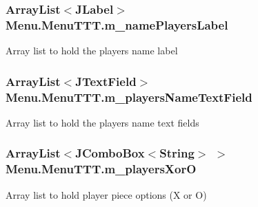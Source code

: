 \subsubsection[{m\+\_\+name\+Players\+Label}]{\setlength{\rightskip}{0pt plus 5cm}Array\+List$<$J\+Label$>$ Menu.\+Menu\+T\+T\+T.\+m\+\_\+name\+Players\+Label\hspace{0.3cm}{\ttfamily [private]}}\label{class_menu_1_1_menu_t_t_t_a3a18e1c57089dedf1bdb8808affb405b}
Array list to hold the players name label \hypertarget{class_menu_1_1_menu_t_t_t_a2398e606664e494a0bfd92cd4990404f}{}
\subsubsection[{m\+\_\+players\+Name\+Text\+Field}]{\setlength{\rightskip}{0pt plus 5cm}Array\+List$<$J\+Text\+Field$>$ Menu.\+Menu\+T\+T\+T.\+m\+\_\+players\+Name\+Text\+Field\hspace{0.3cm}{\ttfamily [private]}}\label{class_menu_1_1_menu_t_t_t_a2398e606664e494a0bfd92cd4990404f}
Array list to hold the player\textquotesingle{}s name text fields \hypertarget{class_menu_1_1_menu_t_t_t_a1f431306714855f214aacab632031a23}{}
\subsubsection[{m\+\_\+players\+Xor\+O}]{\setlength{\rightskip}{0pt plus 5cm}Array\+List$<$J\+Combo\+Box$<$String$>$ $>$ Menu.\+Menu\+T\+T\+T.\+m\+\_\+players\+Xor\+O\hspace{0.3cm}{\ttfamily [private]}}\label{class_menu_1_1_menu_t_t_t_a1f431306714855f214aacab632031a23}
Array list to hold player piece options (X or O) \hypertarget{class_menu_1_1_menu_t_t_t_a0d29323e5abc375ee10f1b27ecd6e1bd}{}
